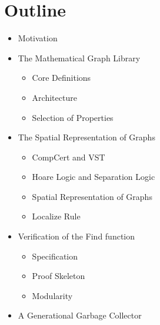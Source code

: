 \documentclass[professionalfonts, xcolor=table]{beamer}
\begin{document}
\section{Outline}
\begin{frame}
  \begin{itemize}
  \item Motivation \hspace{1ex}\alert{\Large\checkmark}
  \item The Mathematical Graph Library \hspace{1ex}\alert{\Large\checkmark}
    \begin{itemize}
    \item Core Definitions \hspace{1ex}\alert{\Large\checkmark}
    \item Architecture \hspace{1ex}\alert{\Large\checkmark}
    \item Selection of Properties \hspace{1ex}\alert{\Large\checkmark}
    \end{itemize}
  \item The Spatial Representation of Graphs \hspace{1ex}\alert{\Large\checkmark}
    \begin{itemize}
    \item CompCert and VST \hspace{1ex}\alert{\Large\checkmark}
    \item Hoare Logic and Separation Logic \hspace{1ex}\alert{\Large\checkmark}
    \item Spatial Representation of Graphs \hspace{1ex}\alert{\Large\checkmark}
    \item Localize Rule \hspace{1ex}\alert{\Large\checkmark}
    \end{itemize}
  \item Verification of the Find function \hspace{1ex}\alert{\Large\checkmark}
    \begin{itemize}
    \item Specification \hspace{1ex}\alert{\Large\checkmark}
    \item Proof Skeleton \hspace{1ex}\alert{\Large\checkmark}
    \item Modularity \hspace{1ex}\alert{\Large\checkmark}
    \end{itemize}
  \item A Generational Garbage Collector
  \end{itemize}
\end{frame}
\end{document}
